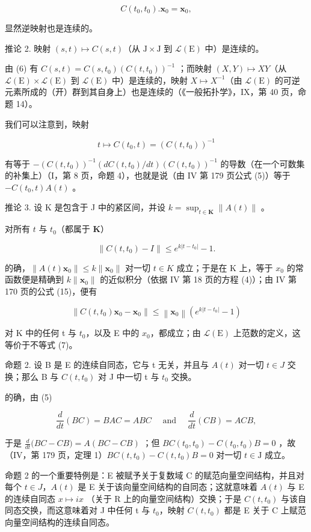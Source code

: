 \[
C (t _ {0}, t _ {0}). \mathbf {x} _ {0} = \mathbf {x} _ {0},
\]

显然逆映射也是连续的。

推论 2. 映射 \((s,t)\mapsto C(s,t)\)（从 \(\mathrm{J}\times \mathrm{J}\) 到 \(\mathcal{L}(\mathrm{E})\) 中）是连续的。

由 (6) 有 \(C(s, t) = C(s, t_0) \left( C(t, t_0) \right)^{-1}\) ；而映射 \((X, Y) \mapsto XY\)（从 \(\mathcal{L}(\mathrm{E}) \times \mathcal{L}(\mathrm{E})\) 到 \(\mathcal{L}(\mathrm{E})\) 中）是连续的，映射 \(X \mapsto X^{-1}\)（由 \(\mathcal{L}(\mathrm{E})\) 的可逆元素所成的（开）群到其自身上）也是连续的（《一般拓扑学》，IX，第 40 页，命题 14）。

我们可以注意到，映射

\[
t \mapsto C (t _ {0}, t) = (C (t, t _ {0})) ^ {- 1}
\]

有等于 \(-(C(t,t_{0}))^{-1}(dC(t,t_{0})/dt)(C(t,t_{0}))^{-1}\) 的导数（在一个可数集的补集上）（I，第 8 页，命题 4），也就是说（由 IV 第 179 页公式 (5)）等于 \(-C(t_{0},t)A(t)\) 。

推论 3. 设 K 是包含于 J 中的紧区间，并设 \(k = \sup_{t \in \mathbf{K}} \| A(t) \|\) 。

对所有 \(t\) 与 \(t_0\)（都属于 \(\mathbf{K}\)）

\[
\left\| C \left(t, t _ {0}\right) - I \right\| \leqslant e ^ {k \left| t - t _ {0} \right|} - 1.\tag{7}
\]

的确，\(\|A(t)\mathbf{x}_{0}\|\leqslant k\|\mathbf{x}_{0}\|\) 对一切 \(t\in K\) 成立；于是在 K 上，等于 \(x_{0}\) 的常函数便是精确到 \(k\|\mathbf{x}_{0}\|\) 的近似积分（依据 IV 第 18 页的方程 (4)）；由 IV 第 170 页的公式 (15)，便有

\[
\left\| C \left(t, t _ {0}\right) \mathbf {x} _ {0} - \mathbf {x} _ {0} \right\| \leqslant \left\| \mathbf {x} _ {0} \right\| \left(e ^ {k | t - t _ {0} |} - 1\right)
\]

对 K 中的任何 t 与 \(t_{0}\)，以及 E 中的 \(x_{0}\)，都成立；由 \(\mathcal{L}(\mathrm{E})\) 上范数的定义，这等价于不等式 (7)。

命题 2. 设 B 是 E 的连续自同态，它与 t 无关，并且与 \(A(t)\) 对一切 \(t \in J\) 交换；那么 B 与 \(C(t, t_{0})\) 对 J 中一切 t 与 \(t_{0}\) 交换。

的确，由 (5)

\[
\frac {d}{d t} (B C) = B A C = A B C \quad \text { and } \quad \frac {d}{d t} (C B) = A C B,
\]

于是 \(\frac{d}{dt}\bigl (BC - CB\bigr) = A(BC - CB)\) ；但 \(BC(t_0,t_0) - C(t_0,t_0)B = 0\) ，故（IV，第 179 页，定理 1）\(BC(t,t_0) - C(t,t_0)B = 0\) 对一切 \(t\in \mathrm{J}\) 成立。

命题 2 的一个重要特例是：E 被赋予关于复数域 C 的赋范向量空间结构，并且对每个 \(t \in J\)，\(A(t)\) 是 E 关于该向量空间结构的自同态；这就意味着 \(A(t)\) 与 E 的连续自同态 \(x \mapsto i x\) （关于 R 上的向量空间结构）交换；于是 \(C(t, t_{0})\) 与该自同态交换，而这意味着对 J 中任何 t 与 \(t_{0}\)，映射 \(C(t, t_{0})\) 都是 E 关于 C 上赋范向量空间结构的连续自同态。

